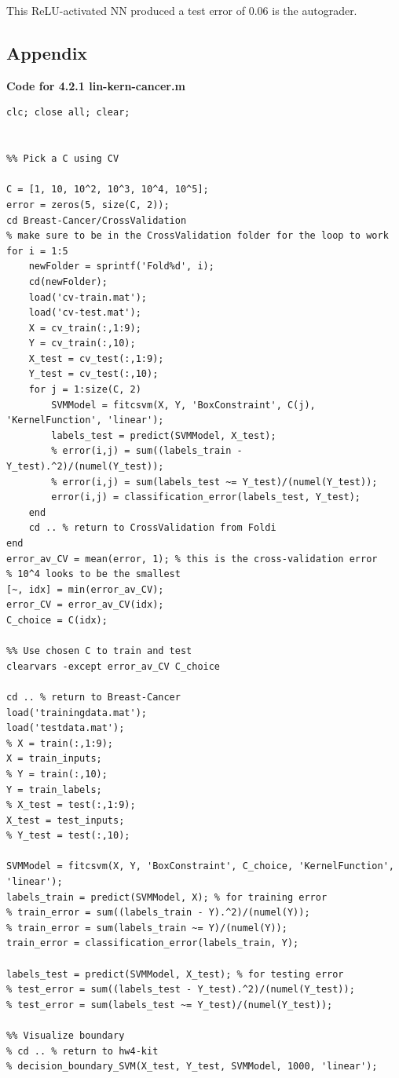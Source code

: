 \documentclass[english]{article}
\begin{document}
\begin{enumerate}
	This ReLU-activated NN produced a test error of $0.06$ is the autograder. 
\end{enumerate}

\subsection{Appendix}
\textbf{Code for 4.2.1 lin-kern-cancer.m}
\color{red}
\begin{verbatim}
clc; close all; clear;


%% Pick a C using CV

C = [1, 10, 10^2, 10^3, 10^4, 10^5];
error = zeros(5, size(C, 2));
cd Breast-Cancer/CrossValidation
% make sure to be in the CrossValidation folder for the loop to work
for i = 1:5
    newFolder = sprintf('Fold%d', i);
    cd(newFolder);
    load('cv-train.mat');
    load('cv-test.mat');
    X = cv_train(:,1:9);
    Y = cv_train(:,10);
    X_test = cv_test(:,1:9);
    Y_test = cv_test(:,10);
    for j = 1:size(C, 2)
        SVMModel = fitcsvm(X, Y, 'BoxConstraint', C(j), 'KernelFunction', 'linear');
        labels_test = predict(SVMModel, X_test);
        % error(i,j) = sum((labels_train - Y_test).^2)/(numel(Y_test));
        % error(i,j) = sum(labels_test ~= Y_test)/(numel(Y_test));
        error(i,j) = classification_error(labels_test, Y_test);
    end
    cd .. % return to CrossValidation from Foldi
end
error_av_CV = mean(error, 1); % this is the cross-validation error
% 10^4 looks to be the smallest
[~, idx] = min(error_av_CV);
error_CV = error_av_CV(idx);
C_choice = C(idx);

%% Use chosen C to train and test
clearvars -except error_av_CV C_choice

cd .. % return to Breast-Cancer
load('trainingdata.mat');
load('testdata.mat');
% X = train(:,1:9);
X = train_inputs;
% Y = train(:,10);
Y = train_labels;
% X_test = test(:,1:9);
X_test = test_inputs;
% Y_test = test(:,10);

SVMModel = fitcsvm(X, Y, 'BoxConstraint', C_choice, 'KernelFunction', 'linear');
labels_train = predict(SVMModel, X); % for training error
% train_error = sum((labels_train - Y).^2)/(numel(Y));
% train_error = sum(labels_train ~= Y)/(numel(Y));
train_error = classification_error(labels_train, Y);

labels_test = predict(SVMModel, X_test); % for testing error
% test_error = sum((labels_test - Y_test).^2)/(numel(Y_test));
% test_error = sum(labels_test ~= Y_test)/(numel(Y_test));

%% Visualize boundary
% cd .. % return to hw4-kit
% decision_boundary_SVM(X_test, Y_test, SVMModel, 1000, 'linear');


\end{verbatim}
\end{document}

